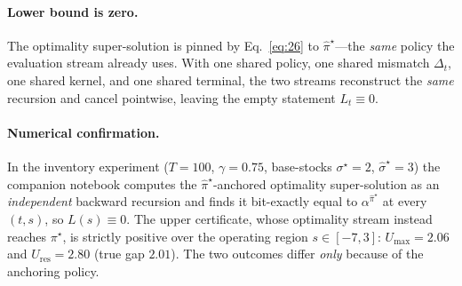 \documentclass[11pt]{article}
\newcommand{\pihat}{\hat\pi}
\theoremstyle{definition}
\begin{document}
\paragraph{Lower bound is zero.} The optimality super-solution is pinned by
Eq.~\eqref{eq:26} to $\pihat^\star$---the \emph{same} policy the evaluation stream
already uses. With one shared policy, one shared mismatch $\Delta_t$, one shared
kernel, and one shared terminal, the two streams reconstruct the \emph{same}
recursion and cancel pointwise, leaving the empty statement $L_t\equiv 0$.

\paragraph{Numerical confirmation.} In the inventory experiment
($T=100$, $\gamma=0.75$, base-stocks $\sigma^\star=2$, $\hat\sigma^\star=3$) the
companion notebook computes the $\pihat^\star$-anchored optimality super-solution as
an \emph{independent} backward recursion and finds it bit-exactly equal to
$\alpha^{\pihat^\star}$ at every $(t,s)$, so $L(s)\equiv 0$. The upper certificate,
whose optimality stream instead reaches $\pi^\star$, is strictly positive over the
operating region $s\in[-7,3]$: $U_{\max}=2.06$ and $U_{\mathrm{res}}=2.80$ (true
gap $2.01$). The two outcomes differ \emph{only} because of the anchoring policy.
\end{document}
